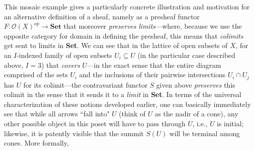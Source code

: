 \documentclass[a4paper]{book}
\theoremstyle{definition}
\theoremstyle{definition}
\theoremstyle{definition}
\theoremstyle{theorem}
\theoremstyle{definition}
\begin{document}
This mosaic example gives a particularly concrete illustration and motivation for an alternative definition of a sheaf, namely as a presheaf functor $F: \mathscr{O}(X)^{op} \rightarrow \textbf{Set}$ that moreover \textit{preserves limits}---where, because we use the opposite category for domain in defining the presheaf, this means that \textit{colimits} get sent to limits in \textbf{Set}. We can see that in the lattice of open subsets of $X$, for an $I$-indexed family of open subsets $U_i \subseteq U$ (in the particular case described above, $I = 3$) that \textit{covers} $U$---in the exact sense that the entire diagram comprised of the sets $U_i$ and the inclusions of their pairwise intersections $U_i \cap U_j$ has $U$ for its colimit---the contravariant functor $S$ given above \textit{preserves} this colimit in the sense that it sends it to a \textit{limit} in \textbf{Set}. In terms of the universal characterization of these notions developed earlier, one can basically immediately see that while all arrows ``fall into" $U$ (think of $U$ as the nadir of a cone), any other possible object in this poset will have to pass through $U$, i.e., $U$ is initial; likewise, it is patently visible that the summit $S(U)$ will be terminal among cones. More formally, 
\end{document}
